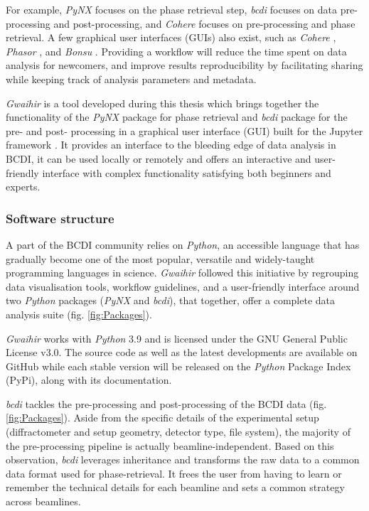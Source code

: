 For example, \textit{PyNX} \parencite{pynx2020operators} focuses on the phase retrieval step, \textit{bcdi} \parencite{jerome_carnis_2021_5741935} focuses on data pre-processing and post-processing, and \textit{Cohere} \parencite{cohere_2021} focuses on pre-processing and phase retrieval.
A few graphical user interfaces (GUIs) also exist, such as \textit{Cohere} \parencite{cohere_2021}, \textit{Phasor} \parencite{dzhigaev_dzhigaevdphasor_2021}, and \textit{Bonsu} \parencite{newton_bonsu_2012}.
Providing a workflow will reduce the time spent on data analysis for newcomers, and improve results reproducibility by facilitating sharing while keeping track of analysis parameters and metadata.

\textit{Gwaihir} is a tool developed during this thesis which brings together the functionality of the \textit{PyNX} package for phase retrieval and \textit{bcdi} package for the pre- and post- processing in a graphical user interface (GUI) built for the Jupyter framework \parencite{Kluyver2016jupyter}.
It provides an interface to the bleeding edge of data analysis in BCDI, it can be used locally or remotely and offers an interactive and user-friendly interface with complex functionality satisfying both beginners and experts.

\subsubsection{Software structure}

A part of the BCDI community relies on \textit{Python}, an accessible language that has gradually become one of the most popular, versatile \parencite{IPython, Newville2016} and widely-taught \parencite{Scopatz2015, McKinney2017, Boulle2019} programming languages in science.
\textit{Gwaihir} followed this initiative by regrouping data visualisation tools, workflow guidelines, and a user-friendly interface around two \textit{Python} packages (\textit{PyNX} and \textit{bcdi}), that together, offer a complete data analysis suite (fig. \ref{fig:Packages}).

\textit{Gwaihir} works with \textit{Python} 3.9 and is licensed under the GNU General Public License v3.0.
The source code as well as the latest developments are available on GitHub while each stable version will be released on the \textit{Python} Package Index (PyPi), along with its documentation.

\textit{bcdi} \parencite{jerome_carnis_2021_5741935} tackles the pre-processing and post-processing of the BCDI data (fig. \ref{fig:Packages}).
Aside from the specific details of the experimental setup (diffractometer and setup geometry, detector type, file system), the majority of the pre-processing pipeline is actually beamline-independent.
Based on this observation, \textit{bcdi} leverages inheritance and transforms the raw data to a common data format used for phase-retrieval.
It frees the user from having to learn or remember the technical details for each beamline and sets a common strategy across beamlines.

